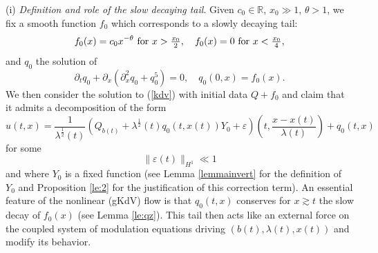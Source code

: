 \documentclass[11pt,a4paper,reqno]{amsart}
\theoremstyle{remark}
\numberwithin{equation}{section}
\newcommand{\be}{\begin{equation}}
\newcommand{\ee}{\end{equation}}
\def\RR{\mathbb{R}}
\def\fref#1{{\rm (\ref{#1})}}
\def\RR{\mathbb{R}}
\def\e{\varepsilon}
\def\fref#1{{\rm (\ref{#1})}}
\def\l{\lambda}
\def\qz{q_0}
\def\Yz{Y_0}
\begin{document}
\noindent(i) \emph{Definition and role of the slow decaying tail}.
 Given $c_0\in \RR$,  $x_0\gg 1$, $\theta>1$, we fix
 a smooth function $f_0$ which corresponds to a slowly decaying tail:
 \be\label{deffzintro}
f_0(x)= c_0 x^{-\theta} \hbox{ for $x>\frac {x_0}2$},\quad
f_0(x)=0 \hbox{ for $x<\frac {x_0}4$}, 
\ee
and  
 $\qz$   the solution of 
\be\label{defqzintro}
\partial_t \qz + \partial_x(\partial_x^2 \qz + \qz^5)=0,\quad
\qz(0,x)= f_0(x).
\ee
We then consider the solution to \fref{kdv} with initial data $Q+f_0$ and claim that it admits a decomposition of the form  
\be\label{uu}
u(t,x)  =  \frac 1{\l^{\frac 12}(t)} \left( Q_{b(t)} + \l^{\frac 12}(t) q_0(t,x(t)) \Yz + \e   \right) \left( t,\frac {x-x(t)}{\l(t)}\right)
+q_0(t,x)
\ee
for some $$\|\e(t)\|_{H^1}\ll 1$$
and where $Y_0$ is a fixed function (see Lemma \ref{lemmainvert} for the definition of $Y_0$ and Proposition \ref{le:2} for the justification of this correction term). 
An essential feature of the nonlinear (gKdV) flow is that $q_0(t,x)$ conserves for $x\gtrsim t$  the slow decay of   $f_0(x)$ (see Lemma \ref{le:qz}). This tail then acts like an external force on the coupled  system of modulation equations driving $(b(t),\l(t),x(t))$ and modify its behavior.

\medskip
\end{document}
